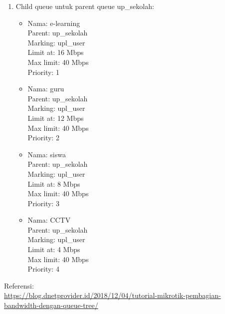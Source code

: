\begin{enumerate}
\begin{enumerate}
		\item Child queue untuk parent queue up\_sekolah:
		\begin{itemize}
			\item Nama: e-learning\\
			Parent: up\_sekolah\\
			Marking: upl\_user\\
			Limit at: 16 Mbps\\
			Max limit: 40 Mbps\\
			Priority: 1
			
			\item Nama: guru\\
			Parent: up\_sekolah\\
			Marking: upl\_user\\
			Limit at: 12 Mbps\\
			Max limit: 40 Mbps\\
			Priority: 2
			
			\item Nama: siswa\\
			Parent: up\_sekolah\\
			Marking: upl\_user\\
			Limit at: 8 Mbps\\
			Max limit: 40 Mbps\\
			Priority: 3
			
			\item Nama: CCTV\\
			Parent: up\_sekolah\\
			Marking: upl\_user\\
			Limit at: 4 Mbps\\
			Max limit: 40 Mbps\\
			Priority: 4
		\end{itemize}
	\end{enumerate}
	Referensi:\\
	\url{https://blog.dnetprovider.id/2018/12/04/tutorial-mikrotik-pembagian-bandwidth-dengan-queue-tree/}
	
\end{enumerate}